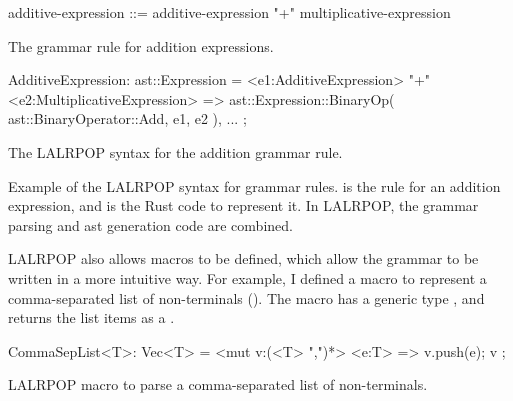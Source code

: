 \documentclass[00-main.tex]{subfiles}
\begin{document}
\begin{listing}[t]
  \begin{sublisting}[t]{\textwidth}
    \begin{GrammarListing}
      additive-expression ::= additive-expression "+" multiplicative-expression
    \end{GrammarListing}
    \caption{The grammar rule for addition expressions.}
    \label{sublst:addition expr grammar rule}
  \end{sublisting}
  \par\medskip %
  \begin{sublisting}[t]{\textwidth}
    \begin{RustListing}
      AdditiveExpression: ast::Expression = {
          <e1:AdditiveExpression> "+" <e2:MultiplicativeExpression>
              => ast::Expression::BinaryOp(
                  ast::BinaryOperator::Add,
                  e1,
                  e2
              ),
          ...
      };
    \end{RustListing}
    \caption{The LALRPOP syntax for the addition grammar rule.}
    \label{sublst:lalrpop syntax addition rule}
  \end{sublisting}
  \caption{
    Example of the LALRPOP syntax for grammar rules.
     is the rule for an addition expression, and  is the Rust code to represent it.
    In LALRPOP, the grammar parsing and \gls{ast} generation code are combined.
  }
  \label{lst:AST generation code example}
\end{listing}

LALRPOP also allows macros to be defined, which allow the grammar to be written in a more intuitive way.
For example, I defined a macro to represent a comma-separated list of non-terminals ().
The macro has a generic type , and returns the list items as a .

\begin{listing}[t]
  \begin{RustListing}
    CommaSepList<T>: Vec<T> = {
        <mut v:(<T> ",")*> <e:T> => {
            v.push(e);
            v
        }
    };
  \end{RustListing}
  \caption{LALRPOP macro to parse a comma-separated list of non-terminals.}
  \label{lst:parser macro for comma-separated list}
\end{listing}
\end{document}
